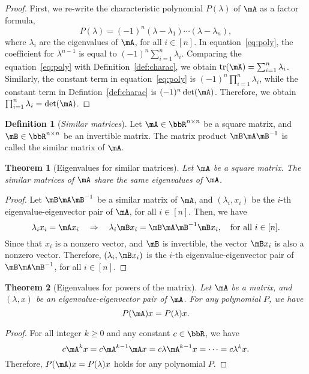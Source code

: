 \documentclass[11pt]{article}
\DeclareMathOperator{\tr}{tr}
\theoremstyle{plain}
\newtheorem{thm}{Theorem}[section]
\theoremstyle{definition}
\newtheorem{defn}{Definition}
\begin{document}
\begin{proof}
	First, we re-write the characteristic polynomial $P(\lambda)$ of $\mA$ as a factor formula,
	\begin{equation}\label{eq:poly}
		P(\lambda) = (-1)^n (\lambda - \lambda_1)\cdots (\lambda - \lambda_n), 
	\end{equation}   
	where $\lambda_i$ are the eigenvalues of $\mA$, for all $ i \in [n]$. In equation~\eqref{eq:poly}, the coefficient for $\lambda^{n-1}$ is equal to $(-1)^n\sum_{i=1}^n \lambda_i$. Comparing the equation~\eqref{eq:poly} with Definition~\ref{def:charac}, we obtain $\tr(\mA) = \sum_{i=1}^n \lambda_i$. Similarly, the constant term in equation~\eqref{eq:poly} is $(-1)^n \prod_{i=1}^n \lambda_i $, while the constant term in Defintion~\ref{def:charac} is $(-1)^n \det(\mA)$.  Therefore, we obtain $\prod_{i=1}^n \lambda_i = \det(\mA)$.
\end{proof}

\begin{defn}[\textit{Similar matrices}]\label{def:similar}
	Let $\mA \in \bbR^{n \times n}$ be a square matrix, and $\mB \in \bbR^{n \times n}$ be an invertible matrix. The matrix product $\mB \mA \mB^{-1}$ is called the similar matrix of $\mA$.
\end{defn}

\begin{thm}[Eigenvalues for similar matrices]\label{thm:similar}
	Let $\mA$ be a square matrix. The similar matrices of $\mA$ share the same eigenvalues of $\mA$.
\end{thm}
\begin{proof}
	Let $\mB \mA \mB^{-1}$ be a similar matrix of $\mA$, and $(\lambda_i, x_i)$ be the $i$-th eigenvalue-eigenvector pair of $\mA$, for all $i \in [n]$. Then, we have
	\[ \lambda_i x_i = \mA x_i \quad \Rightarrow \quad \lambda_i \mB x_i = \mB \mA \mB^{-1} \mB x_i, \quad \text{for all }i \in [n]. \]
	Since that $x_i$ is a nonzero vector, and $\mB$ is invertible, the vector $\mB x_i$ is also a nonzero vector. Therefore, $(\lambda_i, \mB x_i)$ is the $i$-th eigenvalue-eigenvector pair of $\mB \mA \mB^{-1}$, for all $i \in [n]$.
\end{proof}

\begin{thm}[Eigenvalues for powers of the matrix]
	Let $\mA$ be a matrix, and $(\lambda,x)$  be an eigenvalue-eigenvector pair of $\mA$. For any polynomial $P$, we have
	\[ P(\mA) x = P(\lambda) x. \]
\end{thm}
\begin{proof}
	For all integer $k \geq 0$ and any constant $c \in \bbR$, we have
	\[ c\mA^k x = c\mA^{k-1} \mA x= c\lambda \mA^{k-1} x = \cdots = c\lambda^k x.\]
	Therefore, $P(\mA)x = P(\lambda)x$ holds for any polynomial $P$.
\end{proof}
\end{document}
